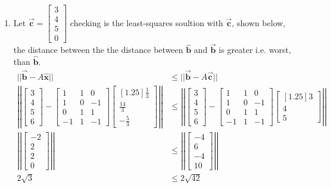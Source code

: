 \documentclass[letter,11pt]{article}
\theoremstyle{definition}
\begin{document}
\begin{tcolorbox}[boxrule=1mm,enhanced jigsaw, breakable,before=\hfill,after=\hfill,adjusted title={Problem 5 solutions}]
\begin{enumerate}[label = \roman*.]
        \item Let $\vec{\boldsymbol{c}} = \begin{bmatrix} 3 \\ 4 \\ 5 \\ 0 \end{bmatrix}$ checking is the least-squares soultion with $\vec{\boldsymbol{c}}$, shown below, the distance between the the distance between $\hat{\boldsymbol{b}}$ and $\vec{\boldsymbol{b}}$ is greater i.e. worst, than $\hat{\boldsymbol{b}}$.
        \begin{align*}
            ||\vec{\boldsymbol{b}}-A\hat{\boldsymbol{x}}|| &\leq ||\vec{\boldsymbol{b}} - A\vec{\boldsymbol{c}}||\\
            \left|\left| \begin{bmatrix} 3 \\ 4 \\ 5 \\ 6 \end{bmatrix} - \begin{bmatrix}1 & 1 & 0 \\ 1 & 0 & -1 \\ 0 & 1 & 1 \\ -1 & 1 & -1 \end{bmatrix}\begin{bmatrix}[1.25] \frac{1}{3} \\ \frac{14}{3} \\ -\frac{5}{3} \end{bmatrix} \right|\right| & \leq \left|\left| \begin{bmatrix} 3 \\ 4 \\ 5 \\ 6 \end{bmatrix} - \begin{bmatrix}1 & 1 & 0 \\ 1 & 0 & -1 \\ 0 & 1 & 1 \\ -1 & 1 & -1 \end{bmatrix}\begin{bmatrix}[1.25] 3 \\ 4 \\ 5 \end{bmatrix} \right|\right| \\ 
            \left|\left| \begin{bmatrix} -2 \\ 2 \\ 2 \\ 0 \end{bmatrix}  \right|\right| & \leq \left|\left|\begin{bmatrix} -4 \\ 6 \\ -4 \\ 10 \end{bmatrix} \right|\right|\\
            2\sqrt{3} & \leq 2\sqrt{42}
        \end{align*}
    \end{enumerate}


\end{tcolorbox}
\end{document}
